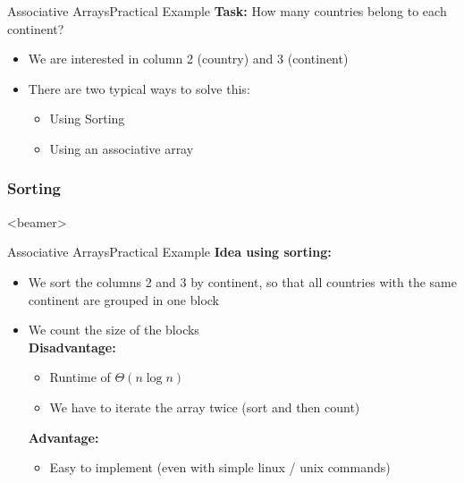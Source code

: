 \begin{frame}{Associative Arrays}{Practical Example}
  \textbf{Task:}
  How many countries belong to each continent?
  \begin{itemize}
    \item
      We are interested in column 2 (country) and 3 (continent)
    \item
      There are two typical ways to solve this:
      \begin{itemize}
        \item
          Using Sorting
        \item
          Using an associative array
      \end{itemize}
  \end{itemize}
\end{frame}


\subsubsection{Sorting}

\begin{frame}<beamer>{\LectureToC}
\end{frame}

\begin{frame}{Associative Arrays}{Practical Example}
  \textbf{Idea using sorting:}
  \begin{itemize}
    \item
      We sort the columns 2 and 3 by continent, so that all countries
      with the same continent are grouped in one block
    \item
      We count the size of the blocks\\[0.5em]
      \textbf{Disadvantage:}
      \begin{itemize}
        \item
          Runtime of $\Theta (n \log n)$
        \item
          We have to iterate the array twice (sort and then count)
      \end{itemize}
      \textbf{Advantage:}
      \begin{itemize}
        \item
          Easy to implement (even with simple linux / unix commands)
      \end{itemize}
  \end{itemize}
\end{frame}

